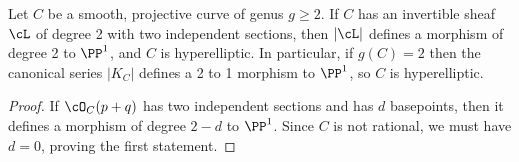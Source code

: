 \begin{lemma}\label{deg 2 morphism}
Let $C$ be a smooth, projective curve of genus $g\geq 2$. If $C$ has an invertible sheaf $\cL$ of degree 2 with two independent sections, then
$|\cL|$ defines a morphism of degree 2 to $\PP^{1}$, and $C$ is hyperelliptic. In particular, if $g(C) = 2$ then the canonical series $|K_{C}|$ defines a 2 to 1 morphism to $\PP^{1}$, so $C$ is hyperelliptic.
\end{lemma}

\begin{proof}
If $\cO_C(p+q)$ has two independent sections and has $d$ basepoints, then it defines a morphism of degree $2-d$ to $\PP^1$. Since $C$ is not rational,
we must have $d=0$, proving the first statement. 
\end{proof}

